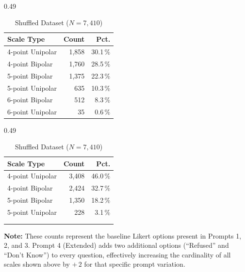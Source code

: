 \begin{table}[H]
    \centering
    \small
    \caption{Distribution of Answer Scale Types across the two experimental datasets.}
    \label{tab:scale_distributions}
    
    \begin{subtable}{0.49\textwidth}
        \centering
        \caption{Reworded Dataset ($N=6,175$)}
        \label{tab:scale_dist_rew}
        \begin{tabular}{lrr}
            \toprule
            \textbf{Scale Type} & \textbf{Count} & \textbf{Pct.} \\
            \midrule
            4-point Unipolar & 1,858 & 30.1\,\% \\
            4-point Bipolar & 1,760 & 28.5\,\% \\
            5-point Bipolar & 1,375 & 22.3\,\% \\
            5-point Unipolar & 635 & 10.3\,\% \\
            6-point Bipolar & 512 & 8.3\,\% \\
            6-point Unipolar & 35 & 0.6\,\% \\
            \bottomrule
        \end{tabular}
    \end{subtable}
    \hfill
    \begin{subtable}{0.49\textwidth}
        \centering
        \caption{Shuffled Dataset ($N=7,410$)}
        \label{tab:scale_dist_shuff}
        \begin{tabular}{lrr}
            \toprule
            \textbf{Scale Type} & \textbf{Count} & \textbf{Pct.} \\
            \midrule
            4-point Unipolar & 3,408 & 46.0\,\% \\
            4-point Bipolar & 2,424 & 32.7\,\% \\
            5-point Bipolar & 1,350 & 18.2\,\% \\
            5-point Unipolar & 228 & 3.1\,\% \\
            & & \\
            & & \\
            \bottomrule
        \end{tabular}
    \end{subtable}

    \vspace{0.3cm}
    \raggedright
    \footnotesize{\textbf{Note:} These counts represent the baseline Likert options present in Prompts 1, 2, and 3. Prompt 4 (Extended) adds two additional options (``Refused'' and ``Don't Know'') to every question, effectively increasing the cardinality of all scales shown above by $+\,2$ for that specific prompt variation.}
\end{table}


